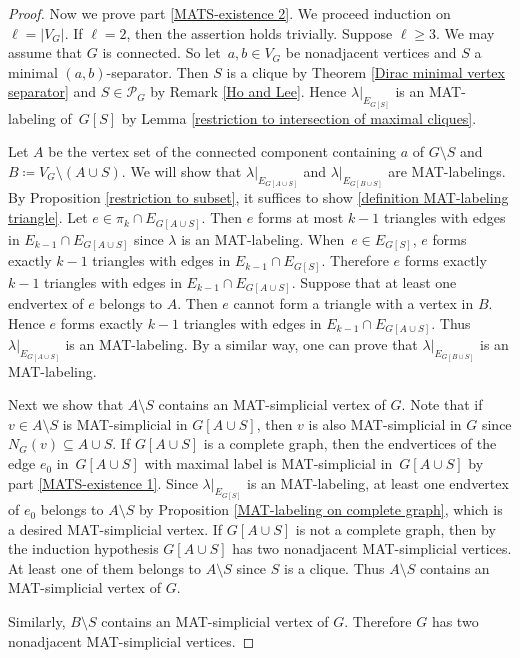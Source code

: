 \begin{proof}
Now we prove part \ref{MATS-existence 2}. 
 We proceed induction on $ \ell = |V_{G}| $. 
If $ \ell=2 $, then the assertion holds trivially. 
Suppose $ \ell \geq 3 $. 
We may assume that $ G $ is connected. 
So let~$ a,b \in V_{G} $ be nonadjacent vertices and $ S $ a minimal $ (a,b) $-separator. 
Then $ S $ is a clique by Theorem \ref{Dirac minimal vertex separator} and $ S \in \mathcal{P}_{G} $ by Remark \ref{Ho and Lee}. 
Hence $ \lambda|_{E_{G[S]}} $ is an MAT-labeling of~$ G[S] $ by Lemma \ref{restriction to intersection of maximal cliques}.

Let $ A $ be the vertex set of the connected component containing $ a $ of $ G\setminus S $ and $ B \coloneqq V_{G} \setminus (A \cup S) $. 
We will show that $ \lambda|_{E_{G[A\cup S]}} $ and $ \lambda|_{E_{G[B\cup S]}} $ are MAT-labelings. 
By Proposition \ref{restriction to subset}, it suffices to show \ref{definition MAT-labeling triangle}. 
Let $ e \in \pi_{k} \cap E_{G[A \cup S]} $. 
Then $ e $ forms at most $ k-1 $ triangles with edges in $ E_{k-1} \cap E_{G[A \cup S]} $ since $ \lambda $ is an MAT-labeling. 
When~$ e \in E_{G[S]} $, $ e $ forms exactly $ k-1 $ triangles with edges in $ E_{k-1} \cap E_{G[S]} $. 
Therefore $ e $ forms exactly $ k-1 $ triangles with edges in $ E_{k-1} \cap E_{G[A \cup S]} $. 
Suppose that at least one endvertex of $ e $ belongs to $ A $. 
Then $ e $ cannot form a triangle with a vertex in $ B $. 
Hence $ e $ forms exactly $ k-1 $ triangles with edges in $ E_{k-1} \cap E_{G[A \cup S]} $. 
Thus $ \lambda|_{E_{G[A\cup S]}} $ is an MAT-labeling.
By a similar way, one can prove that $ \lambda|_{E_{G[B\cup S]}} $ is an MAT-labeling.


Next we show that $ A \setminus S $ contains an MAT-simplicial vertex of $ G $. 
Note that if~$ v \in A \setminus S $ is MAT-simplicial in $ G[A\cup S] $, then $ v $ is also MAT-simplicial in $ G $ since $ N_{G}(v) \subseteq A \cup S $. 
If $ G[A \cup S] $ is a complete graph, then the endvertices of the edge $ e_{0} $ in~$ G[A \cup S] $ with maximal label is MAT-simplicial in~$ G[A \cup S] $ by  part \ref{MATS-existence 1}. 
Since $ \lambda|_{E_{G[S]}} $ is an MAT-labeling, at least one endvertex of $ e_{0} $ belongs to $ A \setminus S $ by Proposition \ref{MAT-labeling on complete graph}, which is a desired MAT-simplicial vertex. 
If $ G[A \cup S] $ is not a complete graph, then by the induction hypothesis $ G[A \cup S] $ has two nonadjacent MAT-simplicial vertices. 
At least one of them belongs to $ A \setminus S $ since $ S $ is a clique. 
Thus $ A \setminus S $ contains an MAT-simplicial vertex of $ G $. 

Similarly, $ B \setminus S $ contains an MAT-simplicial vertex of $ G $. 
Therefore $ G $ has two nonadjacent MAT-simplicial vertices. 
\end{proof}




